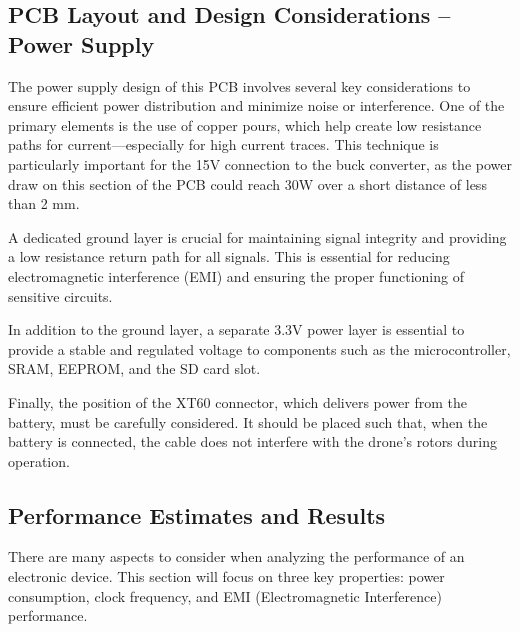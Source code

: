 \documentclass[12pt]{article}
\begin{document}
\subsection{PCB Layout and Design Considerations – Power Supply}
The power supply design of this PCB involves several key considerations to ensure efficient power distribution and minimize noise or interference. One of the primary elements is the use of copper pours, which help create low resistance paths for current—especially for high current traces. This technique is particularly important for the 15V connection to the buck converter, as the power draw on this section of the PCB could reach 30W over a short distance of less than 2 mm.

\par A dedicated ground layer is crucial for maintaining signal integrity and providing a low resistance return path for all signals. This is essential for reducing electromagnetic interference (EMI) and ensuring the proper functioning of sensitive circuits.

\par In addition to the ground layer, a separate 3.3V power layer is essential to provide a stable and regulated voltage to components such as the microcontroller, SRAM, EEPROM, and the SD card slot.

\par Finally, the position of the XT60 connector, which delivers power from the battery, must be carefully considered. It should be placed such that, when the battery is connected, the cable does not interfere with the drone’s rotors during operation.

\subsection{Performance Estimates and Results}
There are many aspects to consider when analyzing the performance of an electronic device. This section will focus on three key properties: power consumption, clock frequency, and EMI (Electromagnetic Interference) performance.
\end{document}
